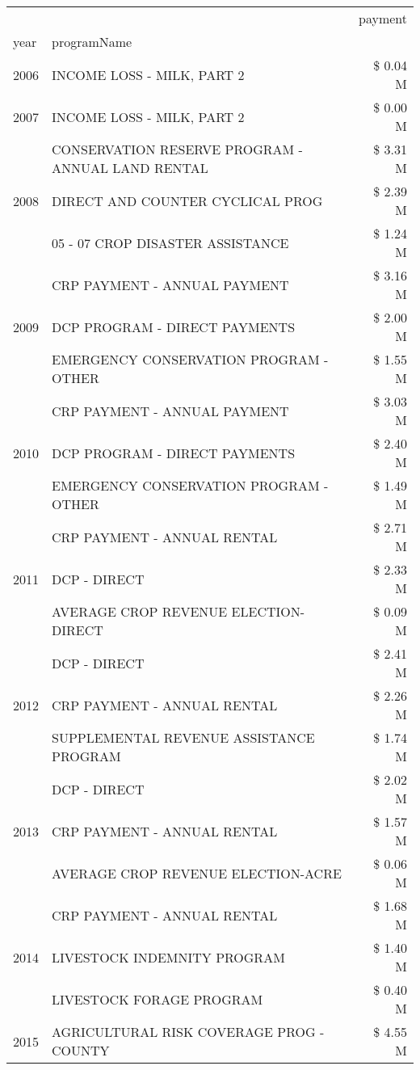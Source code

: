 \begin{tabular}{llr}
\toprule
 &  & payment \\
year & programName &  \\
\midrule
2006 & INCOME LOSS - MILK, PART 2 & \$ 0.04 M \\
\cline{1-3}
2007 & INCOME LOSS - MILK, PART 2 & \$ 0.00 M \\
\cline{1-3}
\multirow[t]{3}{*}{2008} & CONSERVATION RESERVE PROGRAM - ANNUAL LAND RENTAL & \$ 3.31 M \\
 & DIRECT AND COUNTER CYCLICAL PROG & \$ 2.39 M \\
 & 05 - 07 CROP DISASTER ASSISTANCE & \$ 1.24 M \\
\cline{1-3}
\multirow[t]{3}{*}{2009} & CRP PAYMENT - ANNUAL PAYMENT & \$ 3.16 M \\
 & DCP PROGRAM - DIRECT PAYMENTS & \$ 2.00 M \\
 & EMERGENCY CONSERVATION PROGRAM - OTHER & \$ 1.55 M \\
\cline{1-3}
\multirow[t]{3}{*}{2010} & CRP PAYMENT - ANNUAL PAYMENT & \$ 3.03 M \\
 & DCP PROGRAM - DIRECT PAYMENTS & \$ 2.40 M \\
 & EMERGENCY CONSERVATION PROGRAM - OTHER & \$ 1.49 M \\
\cline{1-3}
\multirow[t]{3}{*}{2011} & CRP PAYMENT - ANNUAL RENTAL & \$ 2.71 M \\
 & DCP - DIRECT & \$ 2.33 M \\
 & AVERAGE CROP REVENUE ELECTION-DIRECT & \$ 0.09 M \\
\cline{1-3}
\multirow[t]{3}{*}{2012} & DCP - DIRECT & \$ 2.41 M \\
 & CRP PAYMENT - ANNUAL RENTAL & \$ 2.26 M \\
 & SUPPLEMENTAL REVENUE ASSISTANCE PROGRAM & \$ 1.74 M \\
\cline{1-3}
\multirow[t]{3}{*}{2013} & DCP - DIRECT & \$ 2.02 M \\
 & CRP PAYMENT - ANNUAL RENTAL & \$ 1.57 M \\
 & AVERAGE CROP REVENUE ELECTION-ACRE & \$ 0.06 M \\
\cline{1-3}
\multirow[t]{3}{*}{2014} & CRP PAYMENT - ANNUAL RENTAL & \$ 1.68 M \\
 & LIVESTOCK INDEMNITY PROGRAM & \$ 1.40 M \\
 & LIVESTOCK FORAGE PROGRAM & \$ 0.40 M \\
\cline{1-3}
\multirow[t]{3}{*}{2015} & AGRICULTURAL RISK COVERAGE PROG - COUNTY & \$ 4.55 M \\

\end{tabular}
